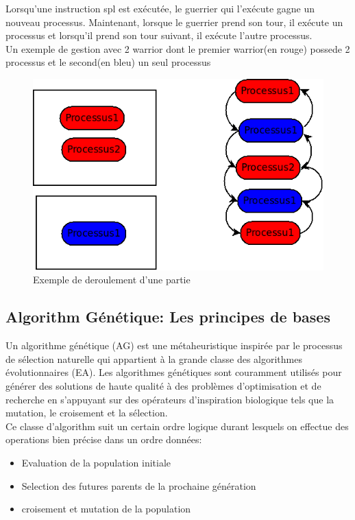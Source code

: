 \documentclass[12pt]{article}
\begin{document}
Lorsqu'une instruction spl est exécutée, le guerrier qui l'exécute gagne un nouveau processus. 
Maintenant, lorsque le guerrier prend son tour, il exécute un processus et lorsqu'il prend son 
tour suivant, il exécute l'autre processus.\\

Un exemple de gestion avec 2 warrior dont le premier warrior(en rouge) possede 2 processus et le second(en bleu)
un seul processus
\begin{figure}[h!]
	\center
	\includegraphics[scale=0.5]{Images/deroulementInterpreteur.png}
	\caption{Exemple de deroulement d'une partie}
\end{figure}
\subsection{Algorithm Génétique: Les principes de bases}
Un algorithme génétique (AG) est une métaheuristique inspirée par le processus de sélection naturelle qui appartient à la grande classe 
des algorithmes évolutionnaires (EA). Les algorithmes génétiques sont couramment utilisés pour générer des solutions de haute qualité à 
des problèmes d'optimisation et de recherche en s'appuyant sur des opérateurs d'inspiration biologique tels que la mutation, 
le croisement et la sélection.\\

Ce classe d'algorithm suit un certain ordre logique durant lesquels on effectue des operations bien précise
dans un ordre données:
\begin{itemize}
	\item Evaluation de la population initiale
	\item Selection des futures parents de la prochaine génération
	\item croisement et mutation de la population
\end{itemize}
\end{document}
